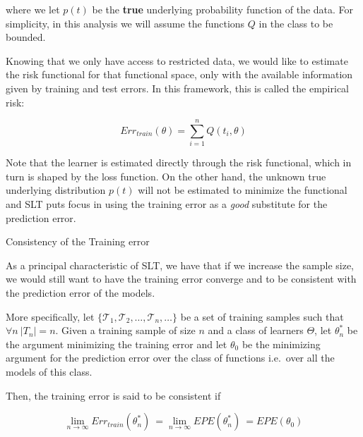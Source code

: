 where we let $p(t)$ be the \textbf{true} underlying probability function of the data.
For simplicity, in this analysis we will assume the functions $Q$ in the class to be bounded.

Knowing that we only have access to restricted data, we would like to estimate the risk functional for that functional space, only with the available information given by training and test errors.
In this framework, this is called the empirical risk:

\begin{equation}\label{vapnik-empiricalRisk}
Err_{train}(\theta) = \sum_{i=1}^n Q(t_i,\theta)
\end{equation}

Note that the learner is estimated directly through the risk functional, which in turn is shaped by the loss function.
On the other hand, the unknown true underlying distribution $p(t)$ will not be estimated to minimize the functional and SLT puts focus in using the training error as a \textit{good} substitute for the prediction error.




\begin{definition}{Consistency of the Training error}

As a principal characteristic of SLT, we have that if we increase the sample size, we would still want to have the training error converge and to be consistent with the prediction error of the models.

More specifically, let $\{\mathcal {T}_1, \mathcal {T}_2, \ldots, \mathcal {T}_n, \ldots \}$ be a set of training samples such that $\forall n \ |T_n|=n$.
Given a training sample of size $n$ and a class of learners $\Theta$, let $\theta^{*}_n$ be the argument minimizing the training error and let $\theta_0$ be the minimizing argument for the prediction error over the class of functions i.e.\ over all the models of this class.

Then, the training error is said to be consistent if

\begin{equation}
\lim_{n\to\infty} Err_{train}(\theta^{*}_n) \ = \lim_{n\to\infty} EPE(\theta^{*}_n) \ = EPE(\theta_0)
\end{equation}

\end{definition}

